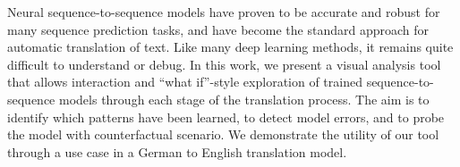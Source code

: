 Neural sequence-to-sequence models have proven to be accurate and robust for many sequence prediction tasks, and have become the standard approach for automatic translation of text. Like many deep learning methods, it remains quite difficult to understand or debug.  In this work, we present a visual analysis tool that allows interaction and ``what if''-style exploration of trained sequence-to-sequence models through each stage of the translation process. The aim is to identify which patterns have been learned, to detect model errors, and to probe the model with counterfactual scenario. We demonstrate the utility of our tool through a use case in a German to English translation model.
